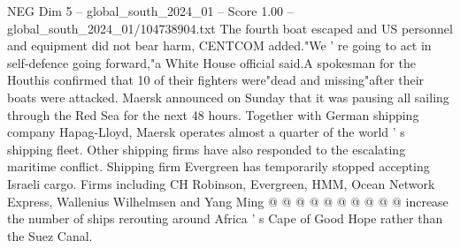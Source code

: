 \begin{textsample}{NEG Dim 5 – global\_south\_2024\_01 – Score 1.00 – global\_south\_2024\_01/104738904.txt}
The fourth boat escaped and US personnel and equipment did not bear harm, CENTCOM added."We ' re going to act in self-defence going forward,"a White House official said.A spokesman for the Houthis confirmed that 10 of their fighters were"dead and missing"after their boats were attacked.
Maersk announced on Sunday that it was pausing all sailing through the Red Sea for the next 48 hours.
Together with German shipping company Hapag-Lloyd, Maersk operates almost a quarter of the world ' s shipping fleet.
Other shipping firms have also responded to the escalating maritime conflict.
Shipping firm Evergreen has temporarily stopped accepting Israeli cargo.
Firms including CH Robinson, Evergreen, HMM, Ocean Network Express, Wallenius Wilhelmsen and Yang Ming @ @ @ @ @ @ @ @ @ @ increase the number of ships rerouting around Africa ' s Cape of Good Hope rather than the Suez Canal.

\end{textsample}
